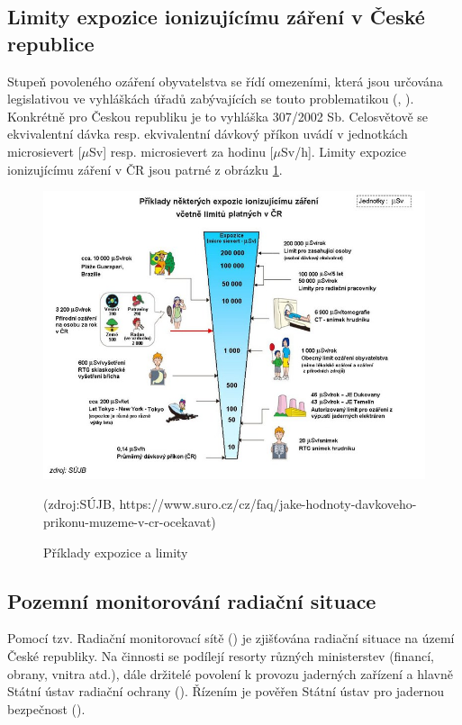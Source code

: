 \subsection{Limity expozice ionizujícímu záření v České republice}
\label{sub:limity}
Stupeň povoleného ozáření obyvatelstva se řídí omezeními, která jsou určována legislativou ve vyhláškách úřadů zabývajících se touto problematikou (, ). Konkrétně pro Českou republiku je to vyhláška  307/2002 Sb. Celosvětově se ekvivalentní dávka resp. ekvivalentní dávkový příkon uvádí v jednotkách microsievert [$\mu$Sv] resp. microsievert za hodinu [$\mu$Sv/h]. Limity expozice ionizujícímu záření v ČR jsou patrné z obrázku \ref{fig:davkyCR}.

\begin{figure}[H]
    \centering
    \includegraphics[scale=0.6]{./pictures/davkyCR.jpeg}
      	\caption[Příklady expozice a limity]{Příklady expozice a limity}(zdroj:SÚJB, https://www.suro.cz/cz/faq/jake-hodnoty-davkoveho-prikonu-muzeme-v-cr-ocekavat)
    	\label{fig:davkyCR}
\end{figure} 

\subsection{Pozemní monitorování radiační situace}
Pomocí tzv. Radiační monitorovací sítě () je zjišťována radiační situace na území České republiky. Na činnosti  se podílejí resorty různých ministerstev (financí, obrany, vnitra atd.), dále držitelé povolení k provozu jaderných zařízení a hlavně Státní ústav radiační ochrany (). Řízením je pověřen Státní ústav pro jadernou bezpečnost (). %

